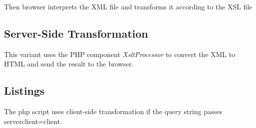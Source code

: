 \documentclass[12pt,a4paper,english]{article}
\begin{document}
Then browser
interprets the XML file and transforms it according to the XSL file

\subsection{Server-Side Transformation}
This variant uses the PHP component \emph{XsltProcessor} to convert the XML to HTML
and send the result to the browser.

\subsection{Listings}
The php script uses client-side transformation if the query string passes serverclient=client.


\end{document}
